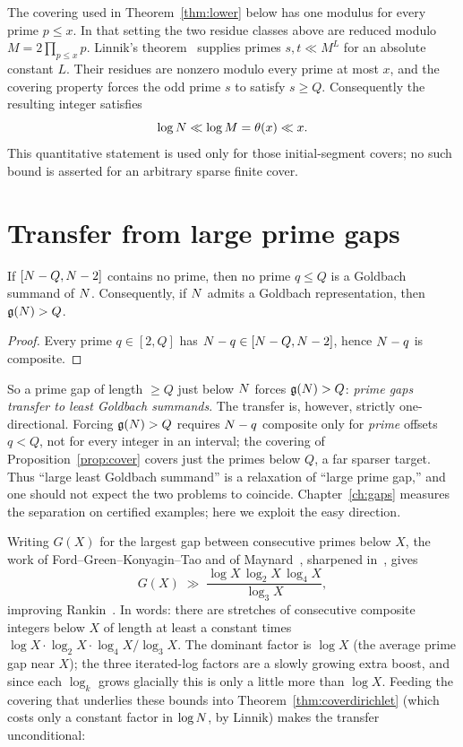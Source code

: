 \begin{remark}\label{rem:size}
The covering used in Theorem~\ref{thm:lower} below has one modulus for
every prime $p\le x$. In that setting the two residue classes above are
reduced modulo $M=2\prod_{p\le x}p$. Linnik's theorem~\cite{Linnik}
supplies primes $s,t\ll M^L$ for an absolute constant $L$. Their
residues are nonzero modulo every prime at most $x$, and the covering
property forces the odd prime $s$ to satisfy $s\ge Q$. Consequently the
resulting integer satisfies
\[
\log N\ll\log M=\theta(x)\ll x.
\]
This quantitative statement is used only for those initial-segment
covers; no such bound is asserted for an arbitrary sparse finite cover.
\end{remark}

\section{Transfer from large prime gaps}\label{sec:gaptransfer}

\begin{proposition}\label{prop:transfer}
If $[N-Q,N-2]$ contains no prime, then no prime $q\le Q$ is a Goldbach
summand of $N$. Consequently, if $N$ admits a Goldbach representation,
then $\mathfrak{g}(N)>Q$.
\end{proposition}
\begin{proof}
Every prime $q\in[2,Q]$ has $N-q\in[N-Q,N-2]$, hence $N-q$ is
composite.
\end{proof}

So a prime gap of length $\ge Q$ just below $N$ forces $\mathfrak{g}(N)>Q$:
\emph{prime gaps transfer to least Goldbach summands}. The transfer is,
however, strictly one-directional. Forcing $\mathfrak{g}(N)>Q$ requires $N-q$
composite only for \emph{prime} offsets $q<Q$, not for every integer in
an interval; the covering of Proposition~\ref{prop:cover} covers just
the primes below $Q$, a far sparser target. Thus ``large least Goldbach
summand'' is a relaxation of ``large prime gap,'' and one should not
expect the two problems to coincide. Chapter~\ref{ch:gaps} measures the
separation on certified examples; here we exploit the easy direction.

Writing $G(X)$ for the largest gap between consecutive primes below
$X$, the work of Ford--Green--Konyagin--Tao and of
Maynard~\cite{FGKT,Maynard}, sharpened in~\cite{FGKMT}, gives
\[
G(X)\;\gg\;\frac{\log X\,\log_2 X\,\log_4 X}{\log_3 X},
\]
improving Rankin~\cite{Rankin}. In words: there are stretches of
consecutive composite integers below $X$ of length at least a constant
times $\log X\cdot\log_2 X\cdot\log_4 X/\log_3 X$. The dominant factor
is $\log X$ (the average prime gap near $X$); the three iterated-log
factors are a slowly growing extra boost, and since each $\log_k$ grows
glacially this is only a little more than $\log X$. Feeding the covering
that underlies these bounds into Theorem~\ref{thm:coverdirichlet} (which
costs only a constant factor in $\log N$, by Linnik) makes the transfer
unconditional:

